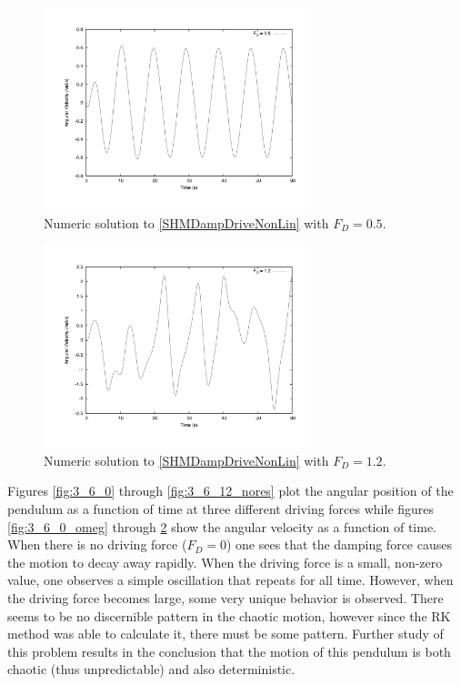 \documentclass[12pt]{article}
\begin{document}
\begin{figure}[!h]
\centering
\includegraphics[width =110 mm, height = 59mm]{Fig_3_6_5_omeg.pdf}
\caption{Numeric solution to \eqref{SHMDampDriveNonLin} with $F_D=0.5$.}
\label{fig:3_6_5_omeg}
\end{figure}
\begin{figure}[!h]
\centering
\includegraphics[width =110 mm, height = 59mm]{Fig_3_6_12_omeg.pdf}
\caption{Numeric solution to \eqref{SHMDampDriveNonLin} with $F_D=1.2$.}
\label{fig:3_6_12_omeg}
\end{figure}

Figures \ref{fig:3_6_0} through \ref{fig:3_6_12_nores} plot the angular position of the pendulum as a function of time at three different driving forces while figures \ref{fig:3_6_0_omeg} through \ref{fig:3_6_12_omeg} show the angular velocity as a function of time.  When there is no driving force ($F_D = 0$) one sees that the damping force causes the motion to decay away rapidly.  When the driving force is a small, non-zero value, one observes a simple oscillation that repeats for all time.  However, when the driving force becomes large, some very unique behavior is observed.  There seems to be no discernible pattern in the chaotic motion, however since the RK method was able to calculate it, there must be some pattern.  Further study of this problem results in the conclusion that the motion of this pendulum is both chaotic (thus unpredictable) and also deterministic.  
\end{document}

